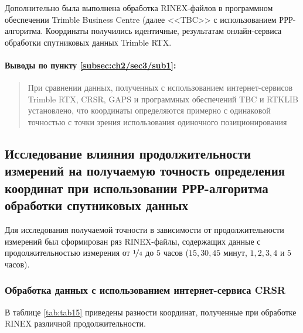 Дополнительно была выполнена обработка RINEX-файлов в программном обеспечении Trimble Business Centre (далее <<TBC>> с использованием РРР-алгоритма. Координаты получились идентичные, результатам онлайн-сервиса обработки спутниковых данных Trimble RTX.

\paragraph{Выводы по пункту \cref{subsec:ch2/sec3/sub1}: } 
\begin{quote}
	При сравнении данных, полученных с использованием интернет-сервисов Trimble RTX, CRSR, GAPS и программных обеспечений TBC и RTKLIB установлено, что координаты определяются примерно с одинаковой точностью с точки зрения использования одиночного позиционирования
\end{quote}





\subsection[Влияние продолжительности измерений]{Исследование влияния продолжительности измерений на получаемую точность определения координат при использовании РРР-алгоритма обработки спутниковых данных}\label{subsec:ch2/sec3/sub2}

Для исследования получаемой точности в зависимости от продолжительности измерений был сформирован ряз RINEX-файлы, содержащих данные с продолжительностью измерения от $\nicefrac{1}{4}$ до $5$ часов ($15, 30, 45$ минут, $1, 2, 3, 4$ и $5$ часов).


\subsubsection{Обработка данных с использованием интернет-сервиса CRSR }\label{subsec:ch2/sec3/sub2/sub1}

В таблице \cref{tab:tab15} приведены разности координат, полученные при обработке RINEX различной продолжительности.


